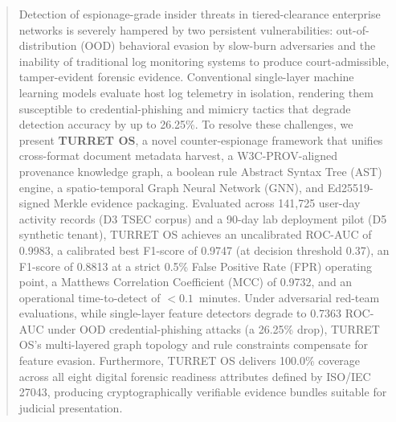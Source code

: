 \begin{abstract}
Detection of espionage-grade insider threats in tiered-clearance enterprise networks is severely hampered by two persistent vulnerabilities: out-of-distribution (OOD) behavioral evasion by slow-burn adversaries and the inability of traditional log monitoring systems to produce court-admissible, tamper-evident forensic evidence. Conventional single-layer machine learning models evaluate host log telemetry in isolation, rendering them susceptible to credential-phishing and mimicry tactics that degrade detection accuracy by up to 26.25\%. To resolve these challenges, we present \textbf{TURRET OS}, a novel counter-espionage framework that unifies cross-format document metadata harvest, a W3C-PROV-aligned provenance knowledge graph, a boolean rule Abstract Syntax Tree (AST) engine, a spatio-temporal Graph Neural Network (GNN), and Ed25519-signed Merkle evidence packaging. Evaluated across 141,725 user-day activity records (D3 TSEC corpus) and a 90-day lab deployment pilot (D5 synthetic tenant), TURRET OS achieves an uncalibrated ROC-AUC of 0.9983, a calibrated best F1-score of 0.9747 (at decision threshold 0.37), an F1-score of 0.8813 at a strict 0.5\% False Positive Rate (FPR) operating point, a Matthews Correlation Coefficient (MCC) of 0.9732, and an operational time-to-detect of $<0.1$~minutes. Under adversarial red-team evaluations, while single-layer feature detectors degrade to 0.7363 ROC-AUC under OOD credential-phishing attacks (a 26.25\% drop), TURRET OS's multi-layered graph topology and rule constraints compensate for feature evasion. Furthermore, TURRET OS delivers 100.0\% coverage across all eight digital forensic readiness attributes defined by ISO/IEC 27043, producing cryptographically verifiable evidence bundles suitable for judicial presentation.
\end{abstract}
